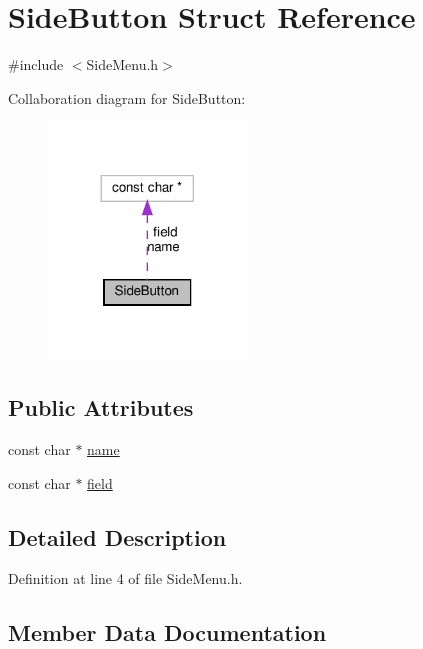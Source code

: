 \hypertarget{struct_side_button}{}\section{Side\+Button Struct Reference}
\label{struct_side_button}


{\ttfamily \#include $<$Side\+Menu.\+h$>$}



Collaboration diagram for Side\+Button\+:
\nopagebreak
\begin{figure}[H]
\begin{center}
\leavevmode
\includegraphics[width=149pt]{struct_side_button__coll__graph}
\end{center}
\end{figure}
\subsection*{Public Attributes}
\begin{DoxyCompactItemize}
\item 
const char $\ast$ \mbox{\hyperlink{struct_side_button_a2533e6acfd5ba40cb7717412c25e6a0c}{name}}
\item 
const char $\ast$ \mbox{\hyperlink{struct_side_button_afd703657d0b75b20a7ca1d2c3147ec34}{field}}
\end{DoxyCompactItemize}


\subsection{Detailed Description}


Definition at line 4 of file Side\+Menu.\+h.



\subsection{Member Data Documentation}
\mbox{\label{struct_side_button_afd703657d0b75b20a7ca1d2c3147ec34}} 
